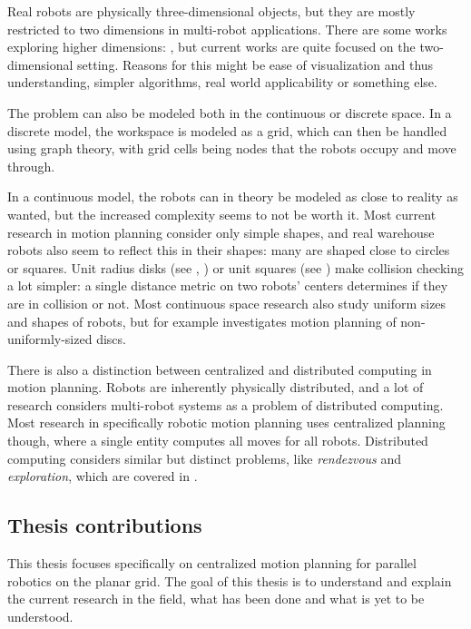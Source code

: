 Real robots are physically three-dimensional objects, but they are mostly restricted to two dimensions in multi-robot applications.
There are some works exploring higher dimensions: \cite{arobots/TurpinMMK14}, but current works are quite focused on the two-dimensional setting.
Reasons for this might be ease of visualization and thus understanding, simpler algorithms, real world applicability or something else.

The problem can also be modeled both in the continuous or discrete space.
In a discrete model, the workspace is modeled as a grid, which can then be handled using graph theory, with grid cells being nodes that the robots occupy and move through.

In a continuous model, the robots can in theory be modeled as close to reality as wanted, but the increased complexity seems to not be worth it.
Most current research in motion planning consider only simple shapes, and real warehouse robots also seem to reflect this in their shapes: many are shaped close to circles or squares.
Unit radius disks (see \cite{siamcomp/DemaineFKMS19}, \cite{compgeom/BanyassadyBBBFH22}) or unit squares (see \cite{jea/YangV22}) make collision checking a lot simpler: a single distance metric on two robots' centers determines if they are in collision or not.
Most continuous space research also study uniform sizes and shapes of robots, but for example \cite{fun/BrockenHKLS21} investigates motion planning of non-uniformly-sized discs.

There is also a distinction between centralized and distributed computing in motion planning.
Robots are inherently physically distributed, and a lot of research considers multi-robot systems as a problem of distributed computing.
Most research in specifically robotic motion planning uses centralized planning though, where a single entity computes all moves for all robots.
Distributed computing considers similar but distinct problems, like \emph{rendezvous} and \emph{exploration}, which are covered in \cite{lncs/FlocchiniGN19}.




\subsection{Thesis contributions}

This thesis focuses specifically on centralized motion planning for parallel robotics on the planar grid.
The goal of this thesis is to understand and explain the current research in the field, what has been done and what is yet to be understood.

